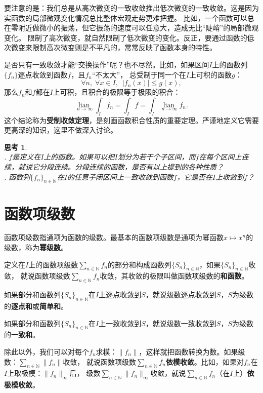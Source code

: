 \documentclass[12pt,UTF8]{ctexbook}
\newcommand{\lian}[1]{
    \underset{#1}{\operatorname{lian}\,}
}
\theoremstyle{definition}
\theoremstyle{plain}
\newtheorem{sk}{思考}[section]
\begin{document}
\begin{appendix}
要注意的是：我们总是从高次微变的一致收敛推出低次微变的一致收敛。这是因为实函数的局部微观变化情况总比整体宏观走势更难把握。
比如，一个函数可以总在零附近做微小的振荡，但它振荡的速度可以任意大，造成无比“陡峭”的局部微观变化。
限制了高次微变，就自然限制了低次微变的变化。反正，要通过函数的低次微变来限制高次微变则是不平凡的，常常反映了函数本身的特性。

是否只有一致收敛才能“交换操作”呢？也不尽然。比如，如果区间$I$上的函数列$\{f_n\}$逐点收敛到函数$f$，且$f_n$“不太大”，
总受制于同一个在$I$上可积的函数$g$：
$$ \forall n, \; \forall x \in I,\,\,\, |f_n(x)| \leqslant g(x), $$
那么$f_n$和$f$都在$I$上可积，且积合的极限等于极限的积合：
$$ \lian{n\to\infty} \int_I f_n = \int_I f = \int_I \lian{n\to\infty} f_n. $$
这个结论称为\textbf{受制收敛定理}，是刻画函数积合性质的重要定理。严谨地定义它需要更高深的知识，这里不做深入讨论。

\begin{sk}
    \mbox{} \\
    . $f$是定义在$I$上的函数。如果可以把$I$划分为若干个子区间，而$f$在每个区间上连续，就说它分段连续。分段连续的函数，是否有以上提到的各种性质？\\
    . 函数列$\{f_n\}_{n\in\mathbb{N}}$在$I$的任意子闭区间上一致收敛到函数$f$，它是否在$I$上收敛到$f$？
\end{sk}

\section{函数项级数}

函数项级数指通项为函数的级数。最基本的函数项级数是通项为幂函数$x\mapsto x^n$的级数，称为\textbf{幂级数}。

定义在$I$上的函数项级数$\sum_{n\in\mathbb{N}} f_n$的部分和构成函数列$\{S_n\}_{n\in\mathbb{N}}$，如果$\{S_n\}_{n\in\mathbb{N}}$收敛，
就说函数项级数$\sum_{n\in\mathbb{N}} f_n$收敛，其收敛的极限叫做函数项级数的\textbf{和函数}。

如果部分和函数列$\{S_n\}_{n\in\mathbb{N}}$在$I$上逐点收敛到$S$，就说级数逐点收敛到$S$，$S$为级数的\textbf{逐点和}或\textbf{简单和}。

如果部分和函数列$\{S_n\}_{n\in\mathbb{N}}$在$I$上一致收敛到$S$，就说级数一致收敛到$S$，$S$为级数的\textbf{一致和}。

除此以外，我们可以对每个$f_n$求模：$\|f_n\|$，这样就把函数转换为数。如果级数：$\sum_{n\in\mathbb{N}} \|f_n\|$收敛，
就说函数项级数$\sum_{n\in\mathbb{N}} f_n$\textbf{依模收敛}。比如，如果对$f_n$在$I$上取极模：$\|f_n\|_{\infty}$后，
级数$\sum_{n\in\mathbb{N}} \|f_n\|_{\infty}$收敛，就说$\sum_{n\in\mathbb{N}} f_n$（在$I$上）\textbf{依极模收敛}。


\end{appendix}
\end{document}
